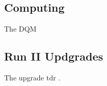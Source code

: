 \subsection{Computing}
\label{SUBSECTION:ExperimentalApparatus_CMS_Computing}

The \gls{DQM} 

\subsection{Run II Updgrades}
\label{SUBSECTION:ExperimentalApparatus_CMS_RUNII}

The upgrade tdr \cite{CMSTDR:CMSL1Upgrade}.
